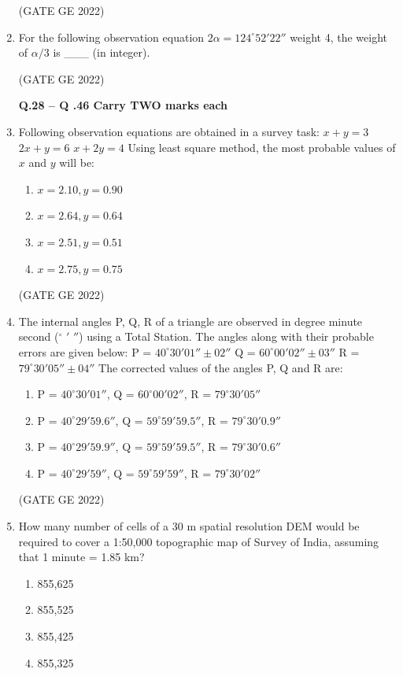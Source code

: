 \documentclass[a4paper, 11pt]{article}
\begin{document}
\begin{enumerate}
\hfill (GATE GE 2022)

\item For the following observation equation $2\alpha = 124^\circ 52' 22''$ weight 4, the weight of $\alpha / 3$ is \_\_\_ (in integer).

\hfill (GATE GE 2022)

\textbf{Q.28 – Q .46 Carry TWO marks each}

\item Following observation equations are obtained in a survey task:  
$x + y = 3$  
$2x + y = 6$  
$x + 2y = 4$  
Using least square method, the most probable values of $x$ and $y$ will be:
\begin{enumerate}
    \item $x = 2.10, y = 0.90$
    \item $x = 2.64, y = 0.64$
    \item $x = 2.51, y = 0.51$
    \item $x = 2.75, y = 0.75$
\end{enumerate}

\hfill (GATE GE 2022)

\item The internal angles P, Q, R of a triangle are observed in degree minute second ($^\circ$ $'$ $''$) using a Total Station. The angles along with their probable errors are given below:  
P = $40^\circ 30' 01'' \pm 02''$  
Q = $60^\circ 00' 02'' \pm 03''$  
R = $79^\circ 30' 05'' \pm 04''$  
The corrected values of the angles P, Q and R are:
\begin{enumerate}
    \item P = $40^\circ 30' 01''$, Q = $60^\circ 00' 02''$, R = $79^\circ 30' 05''$
    \item P = $40^\circ 29' 59.6''$, Q = $59^\circ 59' 59.5''$, R = $79^\circ 30' 0.9''$
    \item P = $40^\circ 29' 59.9''$, Q = $59^\circ 59' 59.5''$, R = $79^\circ 30' 0.6''$
    \item P = $40^\circ 29' 59''$, Q = $59^\circ 59' 59''$, R = $79^\circ 30' 02''$
\end{enumerate}

\hfill (GATE GE 2022)

\item How many number of cells of a 30 m spatial resolution DEM would be required to cover a 1:50,000 topographic map of Survey of India, assuming that 1 minute = 1.85 km?
\begin{enumerate}
    \item 855,625
    \item 855,525
    \item 855,425
    \item 855,325
\end{enumerate}


\end{enumerate}
\end{document}

